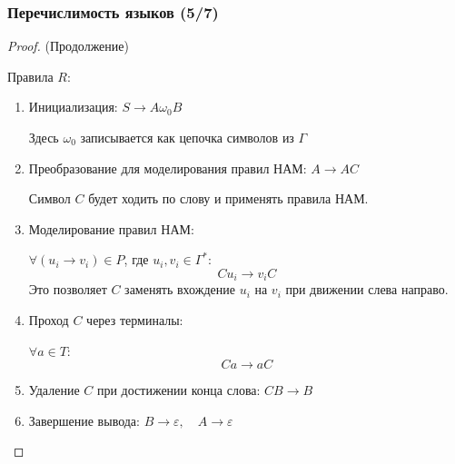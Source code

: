 \begin{frame}
    \frametitle{Перечислимость языков (5/7)}

    \begin{proof} (Продолжение)

        Правила $ R $:
        \begin{enumerate}
            \small

            \item Инициализация: $S \to A \omega_0 B$

                  Здесь $ \omega_0 $ записывается как цепочка символов из $ \Gamma $
            \item Преобразование для моделирования правил НАМ: $ A \to A C$

                  Символ $ C $ будет ходить по слову и применять правила НАМ.
            \item Моделирование правил НАМ:

                  $ \forall  (u_i \to v_i)  \in P $, где $ u_i, v_i \in \Gamma^* $:
                  $$
                      C u_i \to v_i C
                  $$
                  Это позволяет $ C $ заменять вхождение $ u_i $ на $ v_i $ при движении слева направо.
            \item Проход $ C $ через терминалы:

                  $\forall a \in T $:
                  \[
                      C a \to a C
                  \]
            \item Удаление $ C $ при достижении конца слова: $C B \to B$

            \item Завершение вывода: $B \to \varepsilon, \quad A \to \varepsilon$
        \end{enumerate}

    \end{proof}
\end{frame}

